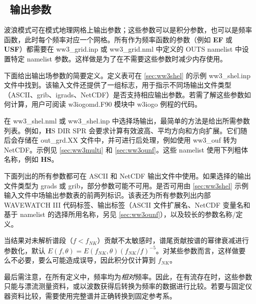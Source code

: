 \vssub
\subsection{~输出参数} \label{sub:outpars}
\vssub

波浪模式可在模式地理网格上输出参数；这些参数可以是积分参数，也可以是频率函数，此时每个频率对应一个网格。所有作为频率函数的参数（例如 \textbf{EF} 或 \textbf{USF}）都需要在 ww3\_grid.inp 或 ww3\_grid.nml 中定义的 {\F OUTS} namelist 中设置特定 namelist 参数。这样做是为了在不需要这些参数时减少内存使用。

下面给出输出场参数的简要定义。定义表可在 \para\ref{sec:ww3shel} 的示例 {\code ww3\_shel.inp} 文件中找到。该输入文件还提供了一组标志，用于指示不同场输出文件类型（ASCII、grib、igrads、NetCDF）是否支持相应输出参数。若需了解这些参数如何计算，用户可阅读 {\code w3iogomd.F90} 模块中 {\code w3iogo} 例程的代码。

在 {\code ww3\_shel.nml} 或 {\code ww3\_shel.inp} 中选择场输出，最简单的方法是给出所需参数列表。例如，{\textbf HS DIR SPR} 会要求计算有效波高、平均方向和方向扩展。它们随后会存储在 {\code out\_grd.XX} 文件中，并可进行后处理，例如使用 {\code ww3\_ouf} 转为 NetCDF。示例见 \para\ref{sec:ww3multi} 和 \para\ref{sec:ww3ounf}。这些 namelist 使用下列粗体名称，例如 \textbf{HS}。

下面列出的所有参数都可在 ASCII 和 NetCDF 输出文件中使用。如果选择的输出文件类型为 grads 或 grib，部分参数可能不可用。是否可用由 \para\ref{sec:ww3shel} 示例输入文件中场输出参数表的前两列标识。该表还为所有参数列出内部 WAVEWATCH III 代码标签、输出标签（ASCII 文件扩展名、NetCDF 变量名和基于 namelist 的选择所用名称，另见 \para\ref{sec:ww3ounf}），以及较长的参数名称/定义。

当结果对未解析谱段（$f<f_{NK}$）贡献不太敏感时，谱尾贡献按谱的幂律衰减进行参数化，默认 $E(f,\theta) = E(f_{NK},\theta) (f_{NK}/f)^{-5}$。对某些参数而言，这样做要么不必要，要么可能造成误导，因此积分仅计算到 $f_{NK}$。


最后需注意，在所有定义中，频率均为\emph{相对}频率。因此，在有流存在时，这些参数只能与漂流测量资料，或以波数获得后转换为频率的数据进行比较。若要与固定仪器资料比较，需要使用完整谱并正确转换到固定参考系。


